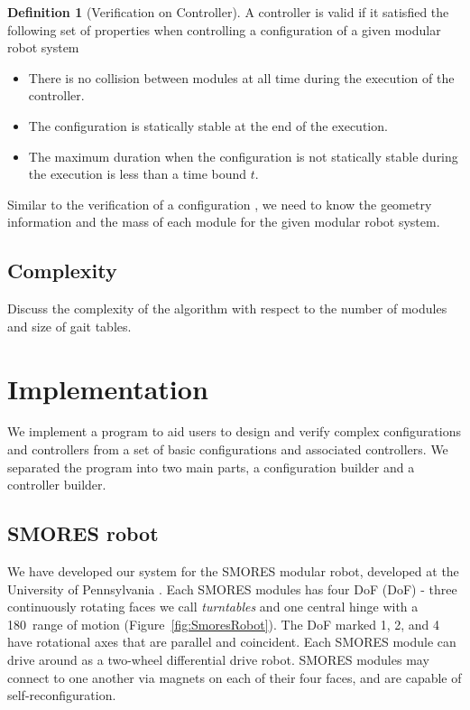 \documentclass[conference]{IEEEtran}
\theoremstyle{definition}
\newtheorem{definition}{Definition}[section]
\begin{document}
\begin{definition}[Verification on Controller]
A controller is valid if it satisfied the following set of properties when controlling a configuration of a given modular robot system
\begin{itemize}
\item There is no collision between modules at all time during the execution of the controller.
\item The configuration is statically stable at the end of the execution.
\item The maximum duration when the configuration is not statically stable during the execution is less than a time bound $t$.
\end{itemize}
Similar to the verification of a configuration , we need to know the geometry information and the mass of each module for the given modular robot system.
\end{definition}



\subsection{Complexity}
Discuss the complexity of the algorithm with respect to the number of modules and size of gait tables.

\section{Implementation }
\label{sec:example}
We implement a program to aid users to design and verify complex configurations and controllers from a set of basic configurations and associated controllers. We separated the program into two main parts, a configuration builder and a controller builder.

\subsection{SMORES robot}
We have developed our system for the SMORES modular robot, developed at the
University of Pennsylvania \cite{Davey2012}. Each SMORES modules has four DoF
(DoF) - three continuously rotating faces we call {\em turntables} and one
central hinge with a 180\textdegree\ range of motion (Figure~\ref{fig:SmoresRobot}). The
DoF marked 1, 2, and 4 have rotational axes that are parallel and coincident.
Each SMORES module can drive around as a two-wheel differential
drive robot.
SMORES modules may connect to one another via magnets on each of their four
faces, and are capable of  self-reconfiguration.
\end{document}
